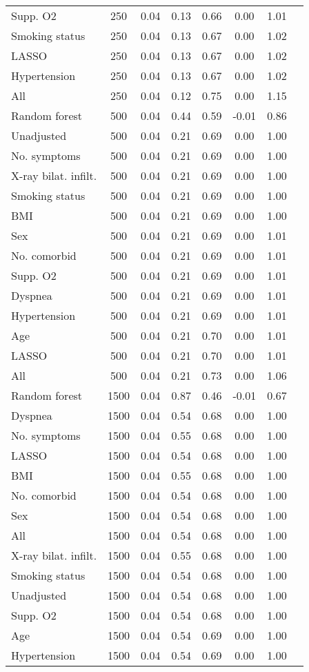 \documentclass{article}
\begin{document}
{\begin{longtable}{lccccccc}
Supp. O2 & 250 & 0.04 & 0.13 & 0.66 &  0.00 & 1.01 \\ 
Smoking status & 250 & 0.04 & 0.13 & 0.67 &  0.00 & 1.02 \\ 
LASSO & 250 & 0.04 & 0.13 & 0.67 &  0.00 & 1.02 \\ 
Hypertension & 250 & 0.04 & 0.13 & 0.67 &  0.00 & 1.02 \\ 
All & 250 & 0.04 & 0.12 & 0.75 &  0.00 & 1.15 \\ \midrule() 
Random forest & 500 & 0.04 & 0.44 & 0.59 & -0.01 & 0.86 \\ 
Unadjusted & 500 & 0.04 & 0.21 & 0.69 &  0.00 & 1.00 \\ 
No. symptoms & 500 & 0.04 & 0.21 & 0.69 &  0.00 & 1.00 \\ 
X-ray bilat. infilt. & 500 & 0.04 & 0.21 & 0.69 &  0.00 & 1.00 \\ 
Smoking status & 500 & 0.04 & 0.21 & 0.69 &  0.00 & 1.00 \\ 
BMI & 500 & 0.04 & 0.21 & 0.69 &  0.00 & 1.00 \\ 
Sex & 500 & 0.04 & 0.21 & 0.69 &  0.00 & 1.01 \\ 
No. comorbid & 500 & 0.04 & 0.21 & 0.69 &  0.00 & 1.01 \\ 
Supp. O2 & 500 & 0.04 & 0.21 & 0.69 &  0.00 & 1.01 \\ 
Dyspnea & 500 & 0.04 & 0.21 & 0.69 &  0.00 & 1.01 \\ 
Hypertension & 500 & 0.04 & 0.21 & 0.69 &  0.00 & 1.01 \\ 
Age & 500 & 0.04 & 0.21 & 0.70 &  0.00 & 1.01 \\ 
LASSO & 500 & 0.04 & 0.21 & 0.70 &  0.00 & 1.01 \\ 
All & 500 & 0.04 & 0.21 & 0.73 &  0.00 & 1.06 \\ \midrule() 
Random forest & 1500 & 0.04 & 0.87 & 0.46 & -0.01 & 0.67 \\ 
Dyspnea & 1500 & 0.04 & 0.54 & 0.68 &  0.00 & 1.00 \\ 
No. symptoms & 1500 & 0.04 & 0.55 & 0.68 &  0.00 & 1.00 \\ 
LASSO & 1500 & 0.04 & 0.54 & 0.68 &  0.00 & 1.00 \\ 
BMI & 1500 & 0.04 & 0.55 & 0.68 &  0.00 & 1.00 \\ 
No. comorbid & 1500 & 0.04 & 0.54 & 0.68 &  0.00 & 1.00 \\ 
Sex & 1500 & 0.04 & 0.54 & 0.68 &  0.00 & 1.00 \\ 
All & 1500 & 0.04 & 0.54 & 0.68 &  0.00 & 1.00 \\ 
X-ray bilat. infilt. & 1500 & 0.04 & 0.55 & 0.68 &  0.00 & 1.00 \\ 
Smoking status & 1500 & 0.04 & 0.54 & 0.68 &  0.00 & 1.00 \\ 
Unadjusted & 1500 & 0.04 & 0.54 & 0.68 &  0.00 & 1.00 \\ 
Supp. O2 & 1500 & 0.04 & 0.54 & 0.68 &  0.00 & 1.00 \\ 
Age & 1500 & 0.04 & 0.54 & 0.69 &  0.00 & 1.00 \\ 
Hypertension & 1500 & 0.04 & 0.54 & 0.69 &  0.00 & 1.00 \\
\bottomrule
\hline
\end{longtable}
}
\end{document}
